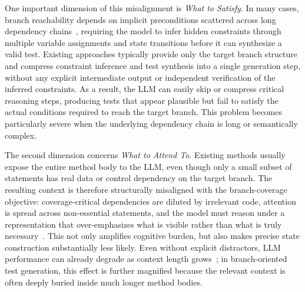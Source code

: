  One important dimension of this misalignment is \emph{What to Satisfy}. 
In many cases, branch reachability depends on implicit preconditions scattered across long dependency chains~\cite{godefroid2025dart}, requiring the model to infer hidden constraints through multiple variable assignments and state transitions before it can synthesize a valid test. 
Existing approaches typically provide only the target branch structure and compress constraint inference and test synthesis into a single generation step, without any explicit intermediate output or independent verification of the inferred constraints. 
As a result, the LLM can easily skip or compress critical reasoning steps, producing tests that appear plausible but fail to satisfy the actual conditions required to reach the target branch. 
This problem becomes particularly severe when the underlying dependency chain is long or semantically complex.

 The second dimension concerns \emph{What to Attend To}. 
Existing methods usually expose the entire method body to the LLM, even though only a small subset of statements has real data or control dependency on the target branch. 
The resulting context is therefore structurally misaligned with the branch-coverage objective: coverage-critical dependencies are diluted by irrelevant code, attention is spread across non-essential statements, and the model must reason under a representation that over-emphasizes what is visible rather than what is truly necessary~\cite{liu2024lost}. 
This not only amplifies cognitive burden, but also makes precise state construction substantially less likely. 
Even without explicit distractors, LLM performance can already degrade as context length grows~\cite{du2025contextlengthhurtsllm, wang2026intelligencedegradationlongcontextllms}; 
in branch-oriented test generation, this effect is further magnified because the relevant context is often deeply buried inside much longer method bodies.


